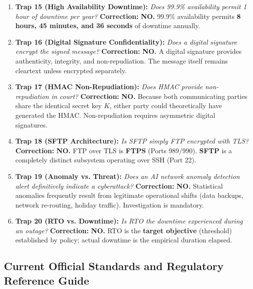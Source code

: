 \begin{enumerate}
\item \textbf{Trap 15 (High Availability Downtime):} \textit{Does 99.9\% availability permit 1 hour of downtime per year?} \newline
\textbf{Correction:} \textbf{NO.} 99.9\% availability permits \textbf{8 hours, 45 minutes, and 36 seconds} of downtime annually.
\item \textbf{Trap 16 (Digital Signature Confidentiality):} \textit{Does a digital signature encrypt the signed message?} \newline
\textbf{Correction:} \textbf{NO.} A digital signature provides authenticity, integrity, and non-repudiation. The message itself remains cleartext unless encrypted separately.
\item \textbf{Trap 17 (HMAC Non-Repudiation):} \textit{Does HMAC provide non-repudiation in court?} \newline
\textbf{Correction:} \textbf{NO.} Because both communicating parties share the identical secret key $K$, either party could theoretically have generated the HMAC. Non-repudiation requires asymmetric digital signatures.
\item \textbf{Trap 18 (SFTP Architecture):} \textit{Is SFTP simply FTP encrypted with TLS?} \newline
\textbf{Correction:} \textbf{NO.} FTP over TLS is \textbf{FTPS} (Ports 989/990). \textbf{SFTP} is a completely distinct subsystem operating over SSH (Port 22).
\item \textbf{Trap 19 (Anomaly vs. Threat):} \textit{Does an AI network anomaly detection alert definitively indicate a cyberattack?} \newline
\textbf{Correction:} \textbf{NO.} Statistical anomalies frequently result from legitimate operational shifts (data backups, network re-routing, holiday traffic). Investigation is mandatory.
\item \textbf{Trap 20 (RTO vs. Downtime):} \textit{Is RTO the downtime experienced during an outage?} \newline
\textbf{Correction:} \textbf{NO.} RTO is the \textbf{target objective} (threshold) established by policy; actual downtime is the empirical duration elapsed.
\end{enumerate}

\subsection{Current Official Standards and Regulatory Reference Guide}

